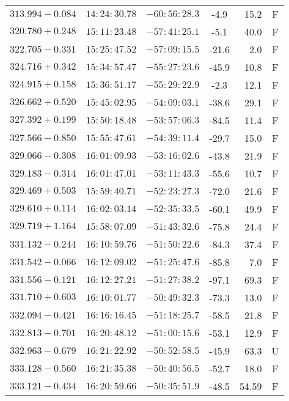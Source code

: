{\begin{longtable}{lcccrc}
	$313.994-0.084  $&    $14:24:30.78$ &   $-60:56:28.3$  &   -4.9&   15.2&  F  \\
	$320.780+0.248  $&    $15:11:23.48$ &   $-57:41:25.1$  &   -5.1&   40.0&  F  \\
	$322.705-0.331  $&    $15:25:47.52$ &   $-57:09:15.5$  &  -21.6&    2.0&  F  \\
	$324.716+0.342  $&    $15:34:57.47$ &   $-55:27:23.6$  &  -45.9&   10.8&  F  \\
	$324.915+0.158  $&    $15:36:51.17$ &   $-55:29:22.9$  &   -2.3&   12.1&  F  \\
	$326.662+0.520  $&    $15:45:02.95$ &   $-54:09:03.1$  &  -38.6&   29.1&  F  \\
	$327.392+0.199  $&    $15:50:18.48$ &   $-53:57:06.3$  &  -84.5&   11.4&  F  \\
	$327.566-0.850  $&    $15:55:47.61$ &   $-54:39:11.4$  &  -29.7&   15.0&  F  \\
	$329.066-0.308  $&    $16:01:09.93$ &   $-53:16:02.6$  &  -43.8&   21.9&  F  \\
	$329.183-0.314  $&    $16:01:47.01$ &   $-53:11:43.3$  &  -55.6&   10.7&  F  \\
	$329.469+0.503  $&    $15:59:40.71$ &   $-52:23:27.3$  &  -72.0&   21.6&  F  \\
	$329.610+0.114  $&    $16:02:03.14$ &   $-52:35:33.5$  &  -60.1&   49.9&  F  \\
	$329.719+1.164  $&    $15:58:07.09$ &   $-51:43:32.6$  &  -75.8&   24.4&  F  \\
	$331.132-0.244  $&    $16:10:59.76$ &   $-51:50:22.6$  &  -84.3&   37.4&  F  \\
	$331.542-0.066  $&    $16:12:09.02$ &   $-51:25:47.6$  &  -85.8&    7.0&  F  \\
	$331.556-0.121  $&    $16:12:27.21$ &   $-51:27:38.2$  &  -97.1&   69.3&  F  \\
	$331.710+0.603  $&    $16:10:01.77$ &   $-50:49:32.3$  &  -73.3&   13.0&  F  \\
	$332.094-0.421  $&    $16:16:16.45$ &   $-51:18:25.7$  &  -58.5&   21.8&  F  \\
	$332.813-0.701  $&    $16:20:48.12$ &   $-51:00:15.6$  &  -53.1&   12.9&  F  \\
	$332.963-0.679  $&    $16:21:22.92$ &   $-50:52:58.5$  &  -45.9&   63.3&  U  \\
	$333.128-0.560  $&    $16:21:35.38$ &   $-50:40:56.5$  &  -52.7&   18.0&  F  \\
	$333.121-0.434  $&    $16:20:59.66$ &   $-50:35:51.9$  &  -48.5&  54.59&  F  \\

\end{longtable}}
